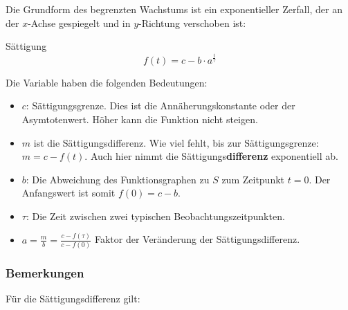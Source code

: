 Die Grundform des begrenzten Wachstums ist ein exponentieller Zerfall,
der an der $x$-Achse gespiegelt und in $y$-Richtung
verschoben ist:

\begin{definition}{Sättigung}{}
$$f(t) =c - b\cdot{} a^{\frac{t}{\tau}}$$
\end{definition}

Die Variable haben die folgenden Bedeutungen:

\begin{itemize}
	\item $c$: Sättigungsgrenze. Dies ist die Annäherungskonstante oder der Asymtotenwert. Höher kann die Funktion nicht steigen.

	\item $m$ ist die
    Sättigungsdifferenz. Wie viel fehlt, bis zur
    Sättigungsgrenze: $m = c - f(t)$. Auch hier nimmt die Sättigungs\textbf{differenz} exponentiell ab.
	\item $b$: Die Abweichung des Funktionsgraphen zu $S$ zum Zeitpunkt $t=0$. Der
    Anfangswert ist somit $f(0) = c - b$.
	\item $\tau$: Die Zeit zwischen zwei typischen
    Beobachtungszeitpunkten.
\item $a=\frac{m}{b}=\frac{c-f(\tau)}{c-f(0)}$ Faktor der Veränderung
  der Sättigungsdifferenz.
\end{itemize}


\subsubsection{Bemerkungen}
\begin{bemerkung}{}{}
  Für die Sättigungsdifferenz gilt:

\end{bemerkung}



